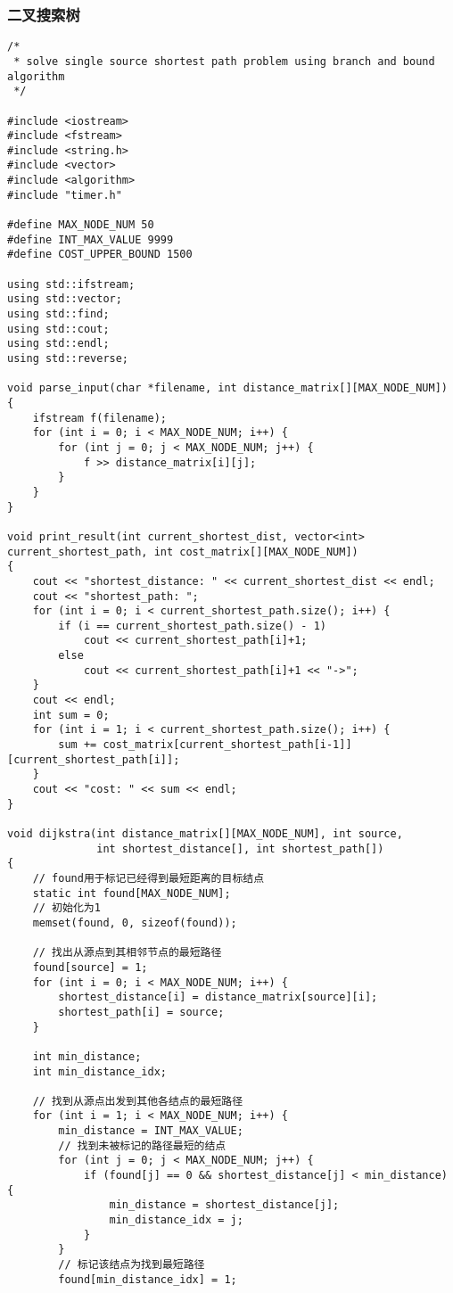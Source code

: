 \documentclass{article}
\begin{document}
	\subsubsection{二叉搜索树}
\begin{lstlisting}
/*
 * solve single source shortest path problem using branch and bound algorithm
 */

#include <iostream>
#include <fstream>
#include <string.h>
#include <vector>
#include <algorithm>
#include "timer.h"

#define MAX_NODE_NUM 50
#define INT_MAX_VALUE 9999
#define COST_UPPER_BOUND 1500

using std::ifstream;
using std::vector;
using std::find;
using std::cout;
using std::endl;
using std::reverse;

void parse_input(char *filename, int distance_matrix[][MAX_NODE_NUM])
{
    ifstream f(filename);
    for (int i = 0; i < MAX_NODE_NUM; i++) {
        for (int j = 0; j < MAX_NODE_NUM; j++) {
            f >> distance_matrix[i][j];
        }
    }
}

void print_result(int current_shortest_dist, vector<int> current_shortest_path, int cost_matrix[][MAX_NODE_NUM])
{
    cout << "shortest_distance: " << current_shortest_dist << endl;
    cout << "shortest_path: ";
    for (int i = 0; i < current_shortest_path.size(); i++) {
        if (i == current_shortest_path.size() - 1)
            cout << current_shortest_path[i]+1;
        else
            cout << current_shortest_path[i]+1 << "->";
    }
    cout << endl;
    int sum = 0;
    for (int i = 1; i < current_shortest_path.size(); i++) {
        sum += cost_matrix[current_shortest_path[i-1]][current_shortest_path[i]];
    }
    cout << "cost: " << sum << endl;
}

void dijkstra(int distance_matrix[][MAX_NODE_NUM], int source,
              int shortest_distance[], int shortest_path[])
{
    // found用于标记已经得到最短距离的目标结点
    static int found[MAX_NODE_NUM];
    // 初始化为1
    memset(found, 0, sizeof(found));

    // 找出从源点到其相邻节点的最短路径
    found[source] = 1;
    for (int i = 0; i < MAX_NODE_NUM; i++) {
        shortest_distance[i] = distance_matrix[source][i];
        shortest_path[i] = source;
    }

    int min_distance;
    int min_distance_idx;

    // 找到从源点出发到其他各结点的最短路径
    for (int i = 1; i < MAX_NODE_NUM; i++) {
        min_distance = INT_MAX_VALUE;
        // 找到未被标记的路径最短的结点
        for (int j = 0; j < MAX_NODE_NUM; j++) {
            if (found[j] == 0 && shortest_distance[j] < min_distance) {
                min_distance = shortest_distance[j];
                min_distance_idx = j;
            }
        }
        // 标记该结点为找到最短路径
        found[min_distance_idx] = 1;


\end{lstlisting}
\end{document}
